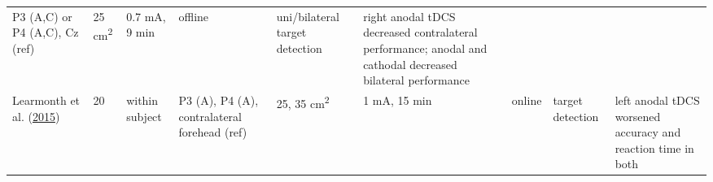 \documentclass[11pt,]{memoir}
\begin{document}
\begin{longtable}[]{@{}lllllllll@{}}
\begin{minipage}[t]{0.11\columnwidth}
P3 (A,C) or P4 (A,C), Cz
(ref)\strut
\end{minipage} & \begin{minipage}[t]{0.03\columnwidth}\raggedright
25
cm\textsuperscript{2}\strut
\end{minipage} & \begin{minipage}[t]{0.05\columnwidth}\raggedright
0.7 mA, 9
min\strut
\end{minipage} & \begin{minipage}[t]{0.05\columnwidth}\raggedright
offline\strut
\end{minipage} & \begin{minipage}[t]{0.11\columnwidth}\raggedright
uni/bilateral target
detection\strut
\end{minipage} & \begin{minipage}[t]{0.24\columnwidth}\raggedright
right anodal tDCS decreased contralateral performance;
anodal and cathodal decreased bilateral performance\strut
\end{minipage}\tabularnewline
\begin{minipage}[t]{0.12\columnwidth}\raggedright
Learmonth et al. (\protect\hyperlink{ref-Learmonth2015}{2015})\strut
\end{minipage} & \begin{minipage}[t]{0.02\columnwidth}\raggedright
20\strut
\end{minipage} & \begin{minipage}[t]{0.04\columnwidth}\raggedright
within
subject\strut
\end{minipage} & \begin{minipage}[t]{0.11\columnwidth}\raggedright
P3 (A), P4 (A),
contralateral forehead
(ref)\strut
\end{minipage} & \begin{minipage}[t]{0.03\columnwidth}\raggedright
25,
35
cm\textsuperscript{2}\strut
\end{minipage} & \begin{minipage}[t]{0.05\columnwidth}\raggedright
1 mA, 15
min\strut
\end{minipage} & \begin{minipage}[t]{0.05\columnwidth}\raggedright
online\strut
\end{minipage} & \begin{minipage}[t]{0.11\columnwidth}\raggedright
target detection\strut
\end{minipage} & \begin{minipage}[t]{0.24\columnwidth}\raggedright
left anodal tDCS worsened accuracy and reaction time in both

\end{minipage}
\end{longtable}
\end{document}
